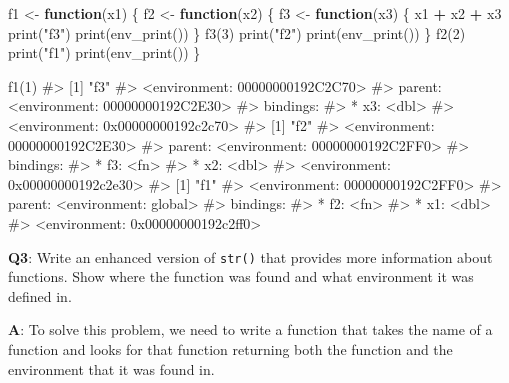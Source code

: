 \documentclass[
]{krantz}
\makeatletter
\newenvironment{Shaded}{\begin{snugshade}}{\end{snugshade}}
\newcommand{\CommentTok}[1]{\textcolor[rgb]{0.56,0.35,0.01}{\textit{#1}}}
\newcommand{\ControlFlowTok}[1]{\textcolor[rgb]{0.13,0.29,0.53}{\textbf{#1}}}
\newcommand{\DecValTok}[1]{\textcolor[rgb]{0.00,0.00,0.81}{#1}}
\newcommand{\KeywordTok}[1]{\textcolor[rgb]{0.13,0.29,0.53}{\textbf{#1}}}
\newcommand{\NormalTok}[1]{#1}
\newcommand{\OperatorTok}[1]{\textcolor[rgb]{0.81,0.36,0.00}{\textbf{#1}}}
\newcommand{\StringTok}[1]{\textcolor[rgb]{0.31,0.60,0.02}{#1}}
\newenvironment{kframe}{%
\medskip{}
\setlength{\fboxsep}{.8em}
 \def\at@end@of@kframe{}%
 \ifinner\ifhmode%
  \def\at@end@of@kframe{\end{minipage}}%
  \begin{minipage}{\columnwidth}%
 \fi\fi%
 \def\FrameCommand##1{\hskip\@totalleftmargin \hskip-\fboxsep
 \colorbox{shadecolor}{##1}\hskip-\fboxsep
     \hskip-\linewidth \hskip-\@totalleftmargin \hskip\columnwidth}%
 \MakeFramed {\advance\hsize-\width
   \@totalleftmargin\z@ \linewidth\hsize
   \@setminipage}}%
 {\par\unskip\endMakeFramed%
 \at@end@of@kframe}
\renewenvironment{Shaded}{\begin{kframe}}{\end{kframe}}
\renewcommand{\KeywordTok} [1]{\textcolor[rgb]{0.00,0.44,0.13}{{#1}}}
\renewcommand{\DecValTok}  [1]{\textcolor[rgb]{0.25,0.63,0.44}{{#1}}}
\renewcommand{\StringTok}  [1]{\textcolor[rgb]{0.25,0.44,0.63}{{#1}}}
\renewcommand{\CommentTok} [1]{\textcolor[rgb]{0.38,0.63,0.69}{{#1}}}
\renewcommand{\NormalTok}  [1]{{#1}}
\makeatother
\begin{document}
\begin{Shaded}
\begin{Highlighting}[]
\NormalTok{f1 <-}\StringTok{ }\ControlFlowTok{function}\NormalTok{(x1) \{}
\NormalTok{  f2 <-}\StringTok{ }\ControlFlowTok{function}\NormalTok{(x2) \{}
\NormalTok{    f3 <-}\StringTok{ }\ControlFlowTok{function}\NormalTok{(x3) \{}
\NormalTok{      x1 }\OperatorTok{+}\StringTok{ }\NormalTok{x2 }\OperatorTok{+}\StringTok{ }\NormalTok{x3}
      \KeywordTok{print}\NormalTok{(}\StringTok{"f3"}\NormalTok{)}
      \KeywordTok{print}\NormalTok{(}\KeywordTok{env_print}\NormalTok{())}
\NormalTok{    \}}
    \KeywordTok{f3}\NormalTok{(}\DecValTok{3}\NormalTok{)}
    \KeywordTok{print}\NormalTok{(}\StringTok{"f2"}\NormalTok{)}
    \KeywordTok{print}\NormalTok{(}\KeywordTok{env_print}\NormalTok{())}
\NormalTok{  \}}
  \KeywordTok{f2}\NormalTok{(}\DecValTok{2}\NormalTok{)}
  \KeywordTok{print}\NormalTok{(}\StringTok{"f1"}\NormalTok{)}
  \KeywordTok{print}\NormalTok{(}\KeywordTok{env_print}\NormalTok{())}
\NormalTok{\}}

\KeywordTok{f1}\NormalTok{(}\DecValTok{1}\NormalTok{)}
\CommentTok{#> [1] "f3"}
\CommentTok{#> <environment: 00000000192C2C70>}
\CommentTok{#> parent: <environment: 00000000192C2E30>}
\CommentTok{#> bindings:}
\CommentTok{#>  * x3: <dbl>}
\CommentTok{#> <environment: 0x00000000192c2c70>}
\CommentTok{#> [1] "f2"}
\CommentTok{#> <environment: 00000000192C2E30>}
\CommentTok{#> parent: <environment: 00000000192C2FF0>}
\CommentTok{#> bindings:}
\CommentTok{#>  * f3: <fn>}
\CommentTok{#>  * x2: <dbl>}
\CommentTok{#> <environment: 0x00000000192c2e30>}
\CommentTok{#> [1] "f1"}
\CommentTok{#> <environment: 00000000192C2FF0>}
\CommentTok{#> parent: <environment: global>}
\CommentTok{#> bindings:}
\CommentTok{#>  * f2: <fn>}
\CommentTok{#>  * x1: <dbl>}
\CommentTok{#> <environment: 0x00000000192c2ff0>}
\end{Highlighting}
\end{Shaded}

\textbf{{Q3}}: Write an enhanced version of \texttt{str()} that provides more information about functions. Show where the function was found and what environment it was defined in.

\textbf{{A}}: To solve this problem, we need to write a function that takes the name of a function and looks for that function returning both the function and the environment that it was found in.
\end{document}
